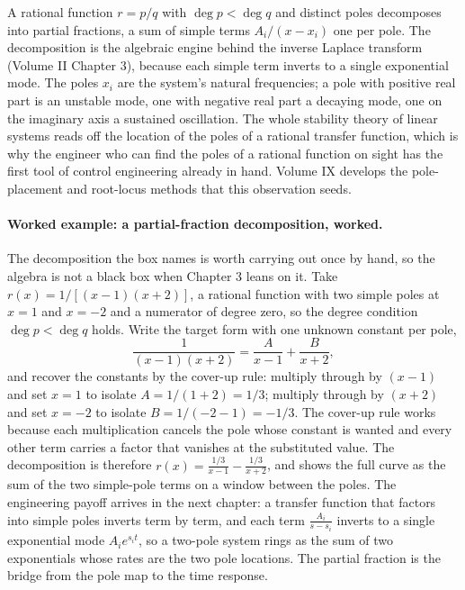 \begin{mastery}
A rational function $r = p/q$ with $\deg p < \deg q$ and distinct
poles decomposes into partial fractions, a sum of simple terms
$A_{i}/(x - x_{i})$ one per pole. The decomposition is the algebraic
engine behind the inverse Laplace transform (Volume II Chapter 3),
because each simple term inverts to a single exponential mode. The
poles $x_{i}$ are the system's natural frequencies; a pole with
positive real part is an unstable mode, one with negative real part a
decaying mode, one on the imaginary axis a sustained oscillation. The
whole stability theory of linear systems reads off the location of
the poles of a rational transfer function, which is why the engineer
who can find the poles of a rational function on sight has the first
tool of control engineering already in hand. Volume IX develops the
pole-placement and root-locus methods that this observation seeds.
\end{mastery}

\paragraph{Worked example: a partial-fraction decomposition, worked.}
The decomposition the box names is worth carrying out once by hand, so
the algebra is not a black box when Chapter 3 leans on it. Take
$r(x) = 1/[(x - 1)(x + 2)]$, a rational function with two simple poles
at $x = 1$ and $x = -2$ and a numerator of degree zero, so the
degree condition $\deg p < \deg q$ holds. Write the target form with
one unknown constant per pole,
\[
  \frac{1}{(x - 1)(x + 2)} = \frac{A}{x - 1} + \frac{B}{x + 2},
\]
and recover the constants by the cover-up rule: multiply through by
$(x - 1)$ and set $x = 1$ to isolate $A = 1/(1 + 2) = 1/3$; multiply
through by $(x + 2)$ and set $x = -2$ to isolate $B = 1/(-2 - 1) =
-1/3$. The cover-up rule works because each multiplication cancels the
pole whose constant is wanted and every other term carries a factor
that vanishes at the substituted value. The decomposition is therefore
$r(x) = \tfrac{1/3}{x - 1} - \tfrac{1/3}{x + 2}$, and
 shows the full curve as the sum
of the two simple-pole terms on a window between the poles. The
engineering payoff arrives in the next chapter: a transfer function
that factors into simple poles inverts term by term, and each term
$\tfrac{A_i}{s - s_i}$ inverts to a single exponential mode
$A_i e^{s_i t}$, so a two-pole system rings as the sum of two
exponentials whose rates are the two pole locations. The partial
fraction is the bridge from the pole map to the time response.

